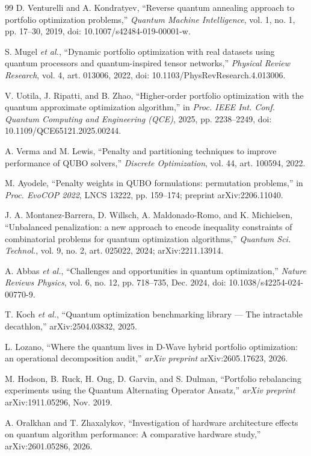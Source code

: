 \documentclass{ieeeaccess}
\begin{document}
\begin{thebibliography}{99}
 D. Venturelli and A. Kondratyev, ``Reverse quantum annealing approach to portfolio optimization problems,'' \textit{Quantum Machine Intelligence}, vol. 1, no. 1, pp. 17--30, 2019, doi: 10.1007/s42484-019-00001-w.

 S. Mugel \textit{et al.}, ``Dynamic portfolio optimization with real datasets using quantum processors and quantum-inspired tensor networks,'' \textit{Physical Review Research}, vol. 4, art. 013006, 2022, doi: 10.1103/PhysRevResearch.4.013006.

 V. Uotila, J. Ripatti, and B. Zhao, ``Higher-order portfolio optimization with the quantum approximate optimization algorithm,'' in \textit{Proc. IEEE Int. Conf. Quantum Computing and Engineering (QCE)}, 2025, pp. 2238--2249, doi: 10.1109/QCE65121.2025.00244.

 A. Verma and M. Lewis, ``Penalty and partitioning techniques to improve performance of QUBO solvers,'' \textit{Discrete Optimization}, vol. 44, art. 100594, 2022.

 M. Ayodele, ``Penalty weights in QUBO formulations: permutation problems,'' in \textit{Proc. EvoCOP 2022}, LNCS 13222, pp. 159--174; preprint arXiv:2206.11040.

 J. A. Montanez-Barrera, D. Willsch, A. Maldonado-Romo, and K. Michielsen, ``Unbalanced penalization: a new approach to encode inequality constraints of combinatorial problems for quantum optimization algorithms,'' \textit{Quantum Sci. Technol.}, vol. 9, no. 2, art. 025022, 2024; arXiv:2211.13914.

 A. Abbas \textit{et al.}, ``Challenges and opportunities in quantum optimization,'' \textit{Nature Reviews Physics}, vol. 6, no. 12, pp. 718--735, Dec. 2024, doi: 10.1038/s42254-024-00770-9.

 T. Koch \textit{et al.}, ``Quantum optimization benchmarking library --- The intractable decathlon,'' arXiv:2504.03832, 2025.

 L. Lozano, ``Where the quantum lives in D-Wave hybrid portfolio optimization: an operational decomposition audit,'' \textit{arXiv preprint} arXiv:2605.17623, 2026.

 M. Hodson, B. Ruck, H. Ong, D. Garvin, and S. Dulman, ``Portfolio rebalancing experiments using the Quantum Alternating Operator Ansatz,'' \textit{arXiv preprint} arXiv:1911.05296, Nov. 2019.

 A. Oralkhan and T. Zhaxalykov, ``Investigation of hardware architecture effects on quantum algorithm performance: A comparative hardware study,'' arXiv:2601.05286, 2026.


\end{thebibliography}
\end{document}
